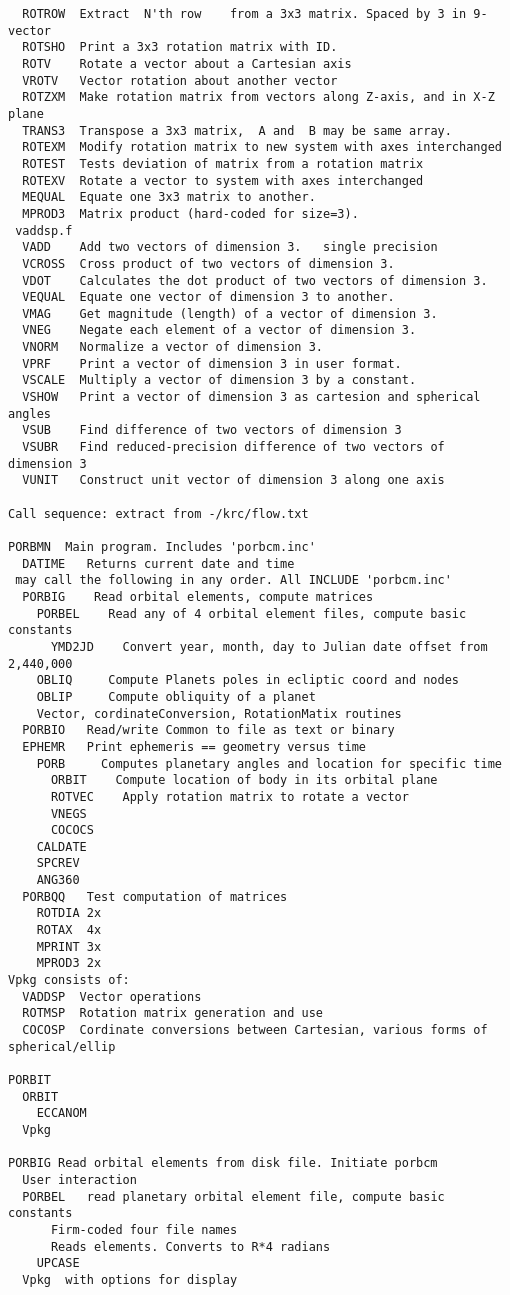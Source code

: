 \documentclass[draft]{article}
\begin{document}
\begin{verbatim}
  ROTROW  Extract  N'th row    from a 3x3 matrix. Spaced by 3 in 9-vector
  ROTSHO  Print a 3x3 rotation matrix with ID. 
  ROTV    Rotate a vector about a Cartesian axis
  VROTV   Vector rotation about another vector
  ROTZXM  Make rotation matrix from vectors along Z-axis, and in X-Z plane
  TRANS3  Transpose a 3x3 matrix,  A and  B may be same array.
  ROTEXM  Modify rotation matrix to new system with axes interchanged
  ROTEST  Tests deviation of matrix from a rotation matrix
  ROTEXV  Rotate a vector to system with axes interchanged
  MEQUAL  Equate one 3x3 matrix to another.
  MPROD3  Matrix product (hard-coded for size=3).
 vaddsp.f
  VADD    Add two vectors of dimension 3.   single precision
  VCROSS  Cross product of two vectors of dimension 3.
  VDOT    Calculates the dot product of two vectors of dimension 3.
  VEQUAL  Equate one vector of dimension 3 to another.
  VMAG    Get magnitude (length) of a vector of dimension 3.
  VNEG    Negate each element of a vector of dimension 3.
  VNORM   Normalize a vector of dimension 3.
  VPRF    Print a vector of dimension 3 in user format.
  VSCALE  Multiply a vector of dimension 3 by a constant.
  VSHOW   Print a vector of dimension 3 as cartesion and spherical angles
  VSUB    Find difference of two vectors of dimension 3
  VSUBR   Find reduced-precision difference of two vectors of dimension 3
  VUNIT   Construct unit vector of dimension 3 along one axis 

Call sequence: extract from -/krc/flow.txt

PORBMN  Main program. Includes 'porbcm.inc'
  DATIME   Returns current date and time
 may call the following in any order. All INCLUDE 'porbcm.inc'
  PORBIG    Read orbital elements, compute matrices
    PORBEL    Read any of 4 orbital element files, compute basic constants
      YMD2JD    Convert year, month, day to Julian date offset from 2,440,000
    OBLIQ     Compute Planets poles in ecliptic coord and nodes
    OBLIP     Compute obliquity of a planet  
    Vector, cordinateConversion, RotationMatix routines
  PORBIO   Read/write Common to file as text or binary
  EPHEMR   Print ephemeris == geometry versus time
    PORB     Computes planetary angles and location for specific time
      ORBIT    Compute location of body in its orbital plane
      ROTVEC    Apply rotation matrix to rotate a vector
      VNEGS
      COCOCS
    CALDATE
    SPCREV
    ANG360
  PORBQQ   Test computation of matrices
    ROTDIA 2x
    ROTAX  4x
    MPRINT 3x
    MPROD3 2x 
Vpkg consists of:
  VADDSP  Vector operations
  ROTMSP  Rotation matrix generation and use
  COCOSP  Cordinate conversions between Cartesian, various forms of spherical/ellip

PORBIT
  ORBIT
    ECCANOM
  Vpkg

PORBIG Read orbital elements from disk file. Initiate porbcm
  User interaction
  PORBEL   read planetary orbital element file, compute basic constants
      Firm-coded four file names
      Reads elements. Converts to R*4 radians
    UPCASE
  Vpkg  with options for display
\end{verbatim}
\end{document}
